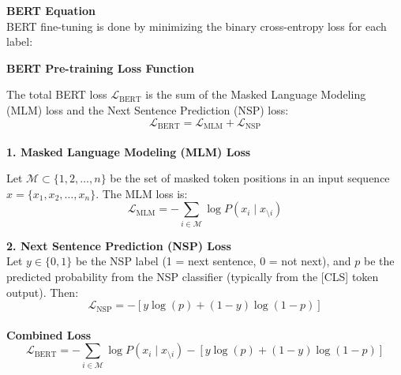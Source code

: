 \begin{algorithmic}
\State \textbf{BERT Equation}
\\
\State BERT fine-tuning is done by minimizing the binary cross-entropy loss for each label:

\textbf{BERT Pre-training Loss Function}

The total BERT loss \( \mathcal{L}_{\text{BERT}} \) is the sum of the Masked Language Modeling (MLM) loss and the Next Sentence Prediction (NSP) loss:
\\
\[
\mathcal{L}_{\text{BERT}} = \mathcal{L}_{\text{MLM}} + \mathcal{L}_{\text{NSP}}
\]
\\
\textbf{1. Masked Language Modeling (MLM) Loss}

Let \( \mathcal{M} \subset \{1, 2, \dots, n\} \) be the set of masked token positions in an input sequence \( x = \{x_1, x_2, \dots, x_n\} \). The MLM loss is:
\\
\[
\mathcal{L}_{\text{MLM}} = - \sum_{i \in \mathcal{M}} \log P(x_i \mid x_{\setminus i})
\]

\textbf{2. Next Sentence Prediction (NSP) Loss}
\\
Let \( y \in \{0, 1\} \) be the NSP label (1 = next sentence, 0 = not next), and \( p \) be the predicted probability from the NSP classifier (typically from the [CLS] token output). Then:
\\
\[
\mathcal{L}_{\text{NSP}} = - \left[ y \log(p) + (1 - y) \log(1 - p) \right]
\]
\\
\textbf{Combined Loss}
\\
\[
\mathcal{L}_{\text{BERT}} = - \sum_{i \in \mathcal{M}} \log P(x_i \mid x_{\setminus i}) - \left[ y \log(p) + (1 - y) \log(1 - p) \right]
\]

\end{algorithmic}